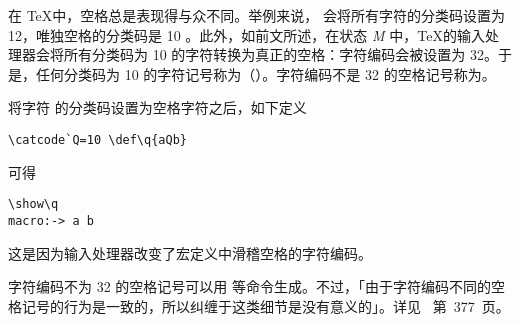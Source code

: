 \documentclass{book}
\begin{document}
在 \TeX 中，空格总是表现得与众不同。举例来说， 会将所有字符的分类码设置为 12，唯独空格的分类码是 10 。此外，如前文所述，在状态 {\itshape M} 中，\TeX 的输入处理器会将所有分类码为 10 的字符转换为真正的空格：字符编码会被设置为 32。于是，任何分类码为 10 的字符记号称为（）。字符编码不是 32 的空格记号称为。

\begin{example}
将字符  的分类码设置为空格字符之后，如下定义
\begin{verbatim}
\catcode`Q=10 \def\q{aQb}
\end{verbatim}
可得
\begin{verbatim}
\show\q
macro:-> a b
\end{verbatim}
这是因为输入处理器改变了宏定义中滑稽空格的字符编码。
\end{example}

字符编码不为 32 的空格记号可以用  等命令生成。不过，「由于字符编码不同的空格记号的行为是一致的，所以纠缠于这类细节是没有意义的」。详见~\cite{Knuth:TeXbook} 第~377~页。
\end{document}
